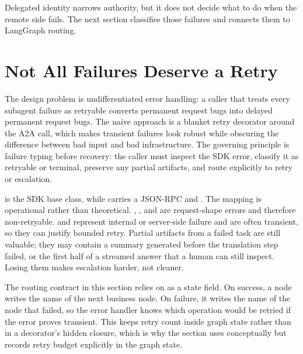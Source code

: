 Delegated identity narrows authority, but it does not decide what to do
when the remote side fails. The next section classifies those failures and
connects them to LangGraph routing.


\section{Not All Failures Deserve a Retry}
\label{sec:a2a-errors}

The design problem is undifferentiated error handling: a caller that
treats every subagent failure as retryable converts permanent request bugs
into delayed permanent request bugs. The naive approach is a blanket retry
decorator around the A2A call, which makes transient failures look robust
while obscuring the difference between bad input and bad infrastructure.
The governing principle is failure typing before recovery: the caller must
inspect the SDK error, classify it as retryable or terminal, preserve any
partial artifacts, and route explicitly to retry or escalation.

 is the SDK base class, while  carries a
JSON-RPC  and . The mapping is operational rather
than theoretical. , , and  are
request-shape errors and therefore non-retryable.  and
 represent internal or server-side failure and are often
transient, so they can justify bounded retry. Partial artifacts from a
failed task are still valuable; they may contain a summary generated before
the translation step failed, or the first half of a streamed answer that a
human can still inspect. Losing them makes escalation harder, not cleaner.

The routing contract in this section relies on  as a state
field. On success, a node writes the name of the next business node. On
failure, it writes the name of the node that failed, so the error handler
knows which operation would be retried if the error proves transient. This
keeps retry count inside graph state rather than in a decorator's hidden
closure, which is why the section uses  conceptually
but records retry budget explicitly in the graph state.

